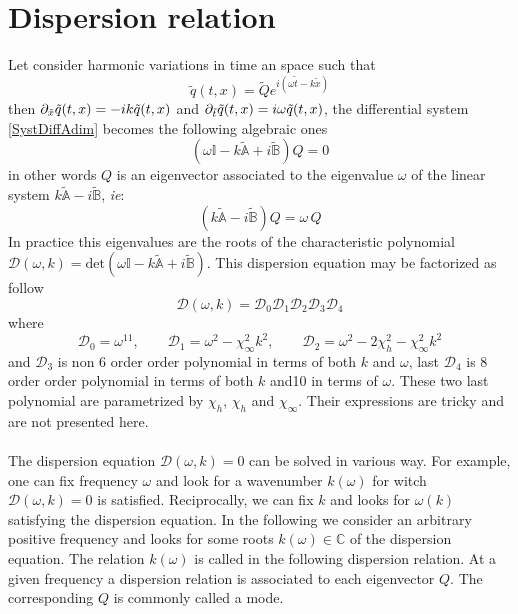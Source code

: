 \documentclass[
10pt, %
a4paper, %
oneside, %
headinclude,footinclude, %
table
]{scrartcl}
\begin{document}
\section{Dispersion relation}
Let consider harmonic variations in time an space such that 
$$
\tilde{q}(t,x)=\tilde{Q}e^{i(\omega \tilde{t}-k\tilde{x})}
$$
then $\partial_{\tilde{x}}\tilde{q}(t,x)=-ik\tilde{q}(t,x)$ and 
$\partial_{\tilde{t}}\tilde{q}(t,x)=i\omega\tilde{q}(t,x)$, the differential system 
\eqref{SystDiffAdim} becomes the following algebraic ones
\begin{equation}
\left(\omega\mathbb{I} -k\tilde{\mathbb{A}}+i\tilde{\mathbb{B}}\right)Q=0
\end{equation}
in other words $Q$ is an eigenvector associated to the eigenvalue $\omega$ of the linear system $k\tilde{\mathbb{A}}-i\tilde{\mathbb{B}}$, \textit{ie}:
$$
\left(k\tilde{\mathbb{A}}-i\tilde{\mathbb{B}}\right)Q=\omega \, Q
$$
In practice this eigenvalues are the roots of the characteristic polynomial $\mathcal{D}(\omega,k)=\textrm{det}(\omega\mathbb{I} -k\tilde{\mathbb{A}}+i\tilde{\mathbb{B}})$. This dispersion equation may be factorized as follow
$$
\mathcal{D}(\omega,k)=\mathcal{D}_{0}\mathcal{D}_{1}\mathcal{D}_{2}\mathcal{D}_{3}\mathcal{D}_{4}
$$
where 
$$
\mathcal{D}_{0}=\omega^{11}, \quad\quad
\mathcal{D}_{1}=\omega^2-\chi_{\infty}^2k^2, \quad\quad
\mathcal{D}_{2}=\omega^2-2 \chi_{h}^2-\chi_{\infty}^2k^2
$$
and $\mathcal{D}_{3}$ is non 6 order order polynomial in terms of both $k$ and $\omega$, last $\mathcal{D}_{4}$  is 8 order order polynomial in terms of both $k$ and10 in terms of $\omega$. These two last polynomial are parametrized by $\chi_{h}$, $\chi_{h}$ and $\chi_{\infty}$. Their expressions are tricky and are not presented here. \\
\\
The dispersion equation $\mathcal{D}(\omega,k)=0$ can be solved in various way. For example, one 
can 
fix frequency $\omega$ and look for a wavenumber $k(\omega)$ for witch $\mathcal{D}(\omega,k)=0$ 
is satisfied. Reciprocally, we can fix $k$ and looks for $\omega(k)$ satisfying the dispersion 
equation. In the following we consider an arbitrary positive frequency and looks for some roots 
$k(\omega)\in \mathbb{C}$ of the dispersion equation.  The relation $k(\omega)$ is called in the 
following dispersion relation. At a given frequency a dispersion relation is associated to each 
eigenvector $Q$. The corresponding $Q$ is commonly called a mode. \\
\end{document}
